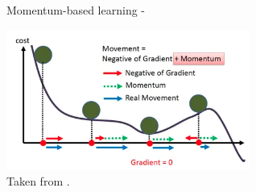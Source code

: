 \begin{frame}[t,allowframebreaks]{
    Momentum-based learning -}
    \begin{center}
        \includegraphics[width=0.60\textwidth]
            {./images/training_issues/khandewal20_gradient_descent_ball.png}\\
        {\tiny 
            \color{col:attribution} 
            Taken from \cite{Medium:GradDescentMomRMSPropAdam}.\\    
        }
    \end{center}                        

    \framebreak



\end{frame}
